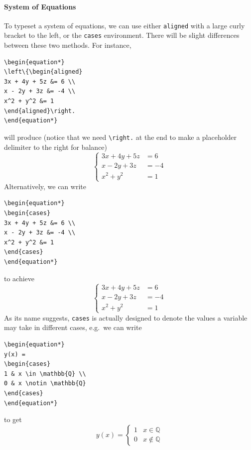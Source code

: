 \paragraph{System of Equations}
To typeset a system of equations, we can use either \texttt{aligned} with a large curly bracket to the left, or the \texttt{cases} environment. There will be slight differences between these two methods. For instance,
\begin{lstlisting}
\begin{equation*}
\left\{\begin{aligned}
3x + 4y + 5z &= 6 \\
x - 2y + 3z &= -4 \\
x^2 + y^2 &= 1
\end{aligned}\right.
\end{equation*}
\end{lstlisting}
will produce (notice that we need \texttt{\textbackslash right.} at the end to make a placeholder delimiter to the right for balance)
\begin{equation*}
\left\{\begin{aligned}
3x + 4y + 5z &= 6 \\
x - 2y + 3z &= -4 \\
x^2 + y^2 &= 1
\end{aligned}\right.
\end{equation*}
Alternatively, we can write
\begin{lstlisting}
\begin{equation*}
\begin{cases}
3x + 4y + 5z &= 6 \\
x - 2y + 3z &= -4 \\
x^2 + y^2 &= 1
\end{cases}
\end{equation*}
\end{lstlisting}
to achieve
\begin{equation*}
\begin{cases}
3x + 4y + 5z &= 6 \\
x - 2y + 3z &= -4 \\
x^2 + y^2 &= 1
\end{cases}
\end{equation*}
As its name suggests, \verb|cases| is actually designed to denote the values a variable may take in different cases, e.g.\ we can write
\begin{lstlisting}
\begin{equation*}
y(x) = 
\begin{cases}
1 & x \in \mathbb{Q} \\
0 & x \notin \mathbb{Q}
\end{cases}
\end{equation*}
\end{lstlisting}
to get
\begin{equation*}
y(x) = 
\begin{cases}
1 & x \in \mathbb{Q} \\
0 & x \notin \mathbb{Q}
\end{cases}
\end{equation*}

